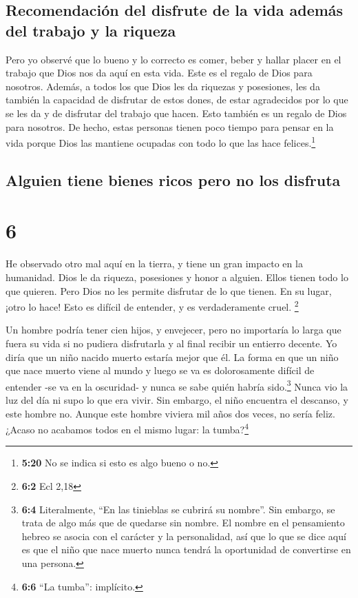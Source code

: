 \hypertarget{recomendaciuxf3n-del-disfrute-de-la-vida-ademuxe1s-del-trabajo-y-la-riqueza}{%
\subsection{Recomendación del disfrute de la vida además del trabajo y
la
riqueza}\label{recomendaciuxf3n-del-disfrute-de-la-vida-ademuxe1s-del-trabajo-y-la-riqueza}}

 Pero yo observé que lo bueno y lo correcto es comer,
beber y hallar placer en el trabajo que Dios nos da aquí en esta vida.
Este es el regalo de Dios para nosotros.  Además, a todos
los que Dios les da riquezas y posesiones, les da también la capacidad
de disfrutar de estos dones, de estar agradecidos por lo que se les da y
de disfrutar del trabajo que hacen. Esto también es un regalo de Dios
para nosotros.  De hecho, estas personas tienen poco
tiempo para pensar en la vida porque Dios las mantiene ocupadas con todo
lo que las hace felices.\footnote{\textbf{5:20} No se indica si esto es
  algo bueno o no.}

\hypertarget{alguien-tiene-bienes-ricos-pero-no-los-disfruta}{%
\subsection{Alguien tiene bienes ricos pero no los
disfruta}\label{alguien-tiene-bienes-ricos-pero-no-los-disfruta}}

\hypertarget{section-5}{%
\section{6}\label{section-5}}

 He observado otro mal aquí en la tierra, y tiene un gran
impacto en la humanidad.  Dios le da riqueza, posesiones y
honor a alguien. Ellos tienen todo lo que quieren. Pero Dios no les
permite disfrutar de lo que tienen. En su lugar, ¡otro lo hace! Esto es
difícil de entender, y es verdaderamente cruel. \footnote{\textbf{6:2}
  Ecl 2,18}

 Un hombre podría tener cien hijos, y envejecer, pero no
importaría lo larga que fuera su vida si no pudiera disfrutarla y al
final recibir un entierro decente. Yo diría que un niño nacido muerto
estaría mejor que él.  La forma en que un niño que nace
muerto viene al mundo y luego se va es dolorosamente difícil de entender
-se va en la oscuridad- y nunca se sabe quién habría sido.\footnote{\textbf{6:4}
  Literalmente, ``En las tinieblas se cubrirá su nombre''. Sin embargo,
  se trata de algo más que de quedarse sin nombre. El nombre en el
  pensamiento hebreo se asocia con el carácter y la personalidad, así
  que lo que se dice aquí es que el niño que nace muerto nunca tendrá la
  oportunidad de convertirse en una persona.}  Nunca vio
la luz del día ni supo lo que era vivir. Sin embargo, el niño encuentra
el descanso, y este hombre no.  Aunque este hombre viviera
mil años dos veces, no sería feliz. ¿Acaso no acabamos todos en el mismo
lugar: la tumba?\footnote{\textbf{6:6} ``La tumba'': implícito.}

